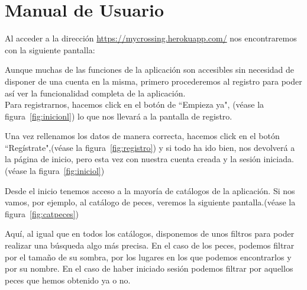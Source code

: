 \chapter{Manual de Usuario}\label{manual}

Al acceder a la dirección \href{https://mycrossing.herokuapp.com/}{https://mycrossing.herokuapp.com/} nos encontraremos con la siguiente pantalla:\\


Aunque muchas de las funciones de la aplicación son accesibles sin necesidad de disponer de una cuenta en la misma, primero procederemos al registro para poder así ver la funcionalidad completa de la aplicación.\\

Para registrarnos, hacemos click en el botón de ``Empieza ya", {(v\'ease la figura~\ref{fig:inicionl})} lo que nos llevará a la pantalla de registro.\\

\clearpage


Una vez rellenamos los datos de manera correcta, hacemos click en el botón ``Regístrate",{(v\'ease la figura~\ref{fig:registro})} y si todo ha ido bien, nos devolverá a la página de inicio, pero esta vez con nuestra cuenta creada y la sesión iniciada.{(v\'ease la figura~\ref{fig:iniciol})}\\


\clearpage

Desde el inicio tenemos acceso a la mayoría de catálogos de la aplicación. Si nos vamos, por ejemplo, al catálogo de peces, veremos la siguiente pantalla.{(v\'ease la figura~\ref{fig:catpeces})}\\


Aquí, al igual que en todos los catálogos, disponemos de unos filtros para poder realizar una búsqueda algo más precisa. En el caso de los peces, podemos filtrar por el tamaño de su sombra, por los lugares en los que podemos encontrarlos y por su nombre. En el caso de haber iniciado sesión podemos filtrar por aquellos peces que hemos obtenido ya o no.\\

